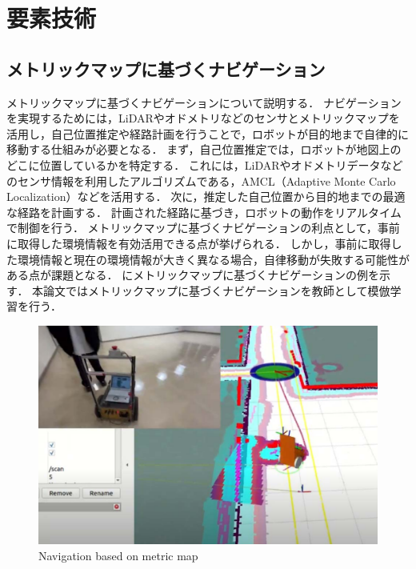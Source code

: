 \chapter{要素技術}
\section{メトリックマップに基づくナビゲーション}
メトリックマップに基づくナビゲーションについて説明する．
ナビゲーションを実現するためには，LiDARやオドメトリなどのセンサとメトリックマップを活用し，自己位置推定や経路計画を行うことで，ロボットが目的地まで自律的に移動する仕組みが必要となる．
まず，自己位置推定では，ロボットが地図上のどこに位置しているかを特定する．
これには，LiDARやオドメトリデータなどのセンサ情報を利用したアルゴリズムである，AMCL（Adaptive Monte Carlo Localization）などを活用する．
次に，推定した自己位置から目的地までの最適な経路を計画する．
計画された経路に基づき，ロボットの動作をリアルタイムで制御を行う．
メトリックマップに基づくナビゲーションの利点として，事前に取得した環境情報を有効活用できる点が挙げられる．
しかし，事前に取得した環境情報と現在の環境情報が大きく異なる場合，自律移動が失敗する可能性がある点が課題となる．
にメトリックマップに基づくナビゲーションの例を示す．
本論文ではメトリックマップに基づくナビゲーションを教師として模倣学習を行う．

\begin{figure}[htbp]
  \centering
  \includegraphics[width=130mm]{images/pdf/other/nav.pdf}
  \caption{Navigation based on metric map}
  \label{fig:nav}
\end{figure}